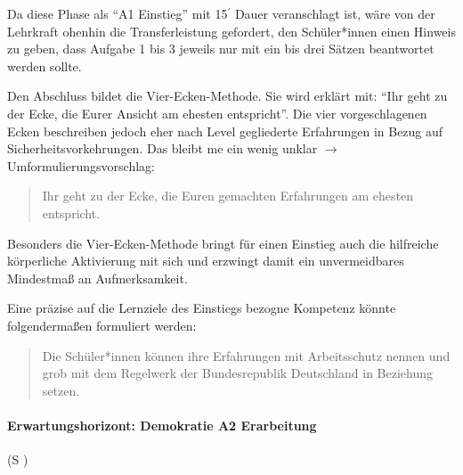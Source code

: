 Da diese Phase als \enquote{A1 Einstieg} mit 15$^\prime$ Dauer veranschlagt ist, wäre von der Lehrkraft ohenhin die Transferleistung gefordert, den Schüler*innen einen Hinweis zu geben, dass Aufgabe 1 bis 3 jeweils nur mit ein bis drei Sätzen beantwortet werden sollte.

Den Abschluss bildet die Vier-Ecken-Methode. Sie wird erklärt mit: \enquote{Ihr geht zu der Ecke, die Eurer Ansicht am ehesten entspricht}.
Die vier vorgeschlagenen Ecken beschreiben jedoch eher nach Level gegliederte Erfahrungen in Bezug auf Sicherheitsvorkehrungen. Das bleibt \gls{me} ein wenig unklar $\rightarrow$ Umformulierungsvorschlag:
\begin{quote}
    Ihr geht zu der Ecke, die Euren gemachten Erfahrungen am ehesten entspricht. 
\end{quote}

Besonders die Vier-Ecken-Methode bringt für einen Einstieg auch die hilfreiche körperliche Aktivierung mit sich und erzwingt damit ein unvermeidbares Mindestmaß an Aufmerksamkeit.  

Eine präzise auf die Lernziele des Einstiegs bezogne Kompetenz könnte folgendermaßen formuliert werden:
\begin{quote}
    Die Schüler*innen können ihre Erfahrungen mit Arbeitsschutz nennen und grob mit dem Regelwerk der Bundesrepublik Deutschland in Beziehung setzen. 
\end{quote}



\paragraph{Erwartungshorizont: Demokratie A2 Erarbeitung} (\gls{S} \pageref{DEMOKRATIE-A2})

